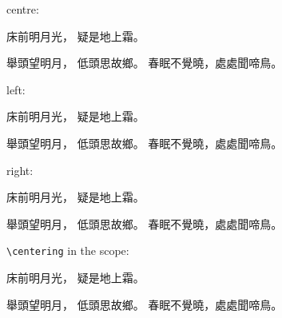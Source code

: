 \documentclass{article}
\begin{document}
centre:

\begin{jyutpingscope}
床前明月光，
疑是地上霜。

舉頭望明月，
低頭思故鄉。
春眠不覺曉，處處聞啼鳥。
\end{jyutpingscope}
left:

\begin{jyutpingscope}
床前明月光，
疑是地上霜。

舉頭望明月，
低頭思故鄉。
春眠不覺曉，處處聞啼鳥。
\end{jyutpingscope}
right:

\begin{jyutpingscope}
床前明月光，
疑是地上霜。

舉頭望明月，
低頭思故鄉。
春眠不覺曉，處處聞啼鳥。
\end{jyutpingscope}
\verb|\centering| in the scope:

\begin{jyutpingscope}[linebreak]
\centering
床前明月光，
疑是地上霜。

舉頭望明月，
低頭思故鄉。
春眠不覺曉，處處聞啼鳥。
\end{jyutpingscope}
\end{document}
